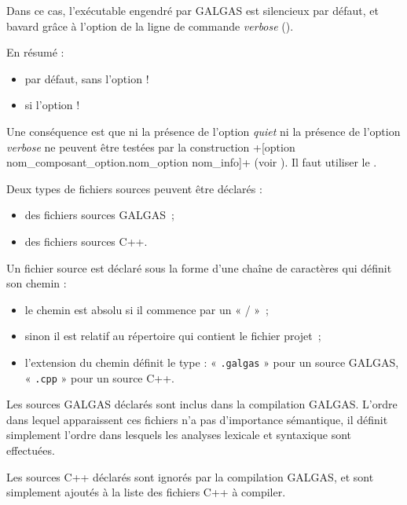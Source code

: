  Dans ce cas, l'exécutable engendré par GALGAS est silencieux par défaut, et bavard grâce à l'option de la ligne de commande \emph{verbose} ().

En résumé :
\begin{itemize}
\item par défaut, sans l'option \ggs!%
\item si l'option \ggs!%
\end{itemize}

Une conséquence est que ni la présence de l'option \emph{quiet} ni la présence de l'option \emph{verbose} ne peuvent être testées par la construction \ggs+[option nom_composant_option.nom_option nom_info]+ (voir ). Il faut utiliser le .








Deux types de fichiers sources peuvent être déclarés :
\begin{itemize}
  \item des fichiers sources GALGAS~;
  \item des fichiers sources C++.
\end{itemize}

Un fichier source est déclaré sous la forme d'une chaîne de caractères qui définit son chemin :
\begin{itemize}
\item le chemin est absolu si il commence par un « / »~;
\item sinon il est relatif au répertoire qui contient le fichier projet~;
\item l'extension du chemin définit le type : « \texttt{.galgas} » pour un source GALGAS, « \texttt{.cpp} » pour un source C++.
\end{itemize}

Les sources GALGAS déclarés sont inclus dans la compilation GALGAS. L'ordre dans lequel apparaissent ces fichiers n'a pas d'importance sémantique, il définit simplement l'ordre dans lesquels les analyses lexicale et syntaxique sont effectuées.

Les sources C++ déclarés sont ignorés par la compilation GALGAS, et sont simplement ajoutés à la liste des fichiers C++ à compiler.



